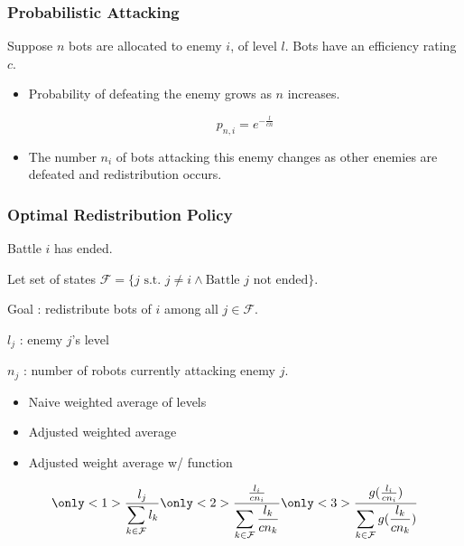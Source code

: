 \documentclass{beamer}
\theoremstyle{definition}
\begin{document}
\begin{frame}
    \frametitle{Probabilistic Attacking}

    Suppose $n$ bots are allocated to enemy $i$, of level $l$.
    Bots have an efficiency rating $c$.

    \begin{center}
    \end{center}

    \pause

    \begin{itemize}
        \item
            Probability of defeating the enemy grows as $n$ increases.

            \begin{equation*}
                p_{n,i} = e^{-\frac{l}{cn}}
            \end{equation*}
        \item
            The number $n_i$ of bots attacking this enemy changes as other
            enemies are defeated and redistribution occurs.
    \end{itemize}
\end{frame}

\begin{frame}
    \frametitle{Optimal Redistribution Policy}
    Battle $ i $ has ended.

    Let set of states $ \mathcal{F} = \{ j \text{ s.t. } j \neq i \wedge \text{Battle } j \text{ not ended} \} $.

    Goal : redistribute bots of $ i $ among all $ j \in \mathcal{F} $.

    $ l_j $ : enemy $ j $'s level

    $ n_j $ : number of robots currently attacking enemy $ j $.

    \begin{itemize}
        \item<1-> Naive weighted average of levels
        \item<2-> Adjusted weighted average
        \item<3-> Adjusted weight average w/ function
    \end{itemize}
    \begin{equation*}
        \only<1>{\frac{l_j}{\displaystyle\sum_{k \in \mathcal{F}}{l_k}}}
        \only<2>{\frac{\frac{l_i}{cn_i}}{\displaystyle\sum_{k \in \mathcal{F}}{\frac{l_k}{cn_k}}}}
        \only<3>{\frac{g(\frac{l_i}{cn_i})}{\displaystyle\sum_{k \in \mathcal{F}}{g(\frac{l_k}{cn_k})}}}
    \end{equation*}
\end{frame}
\end{document}
